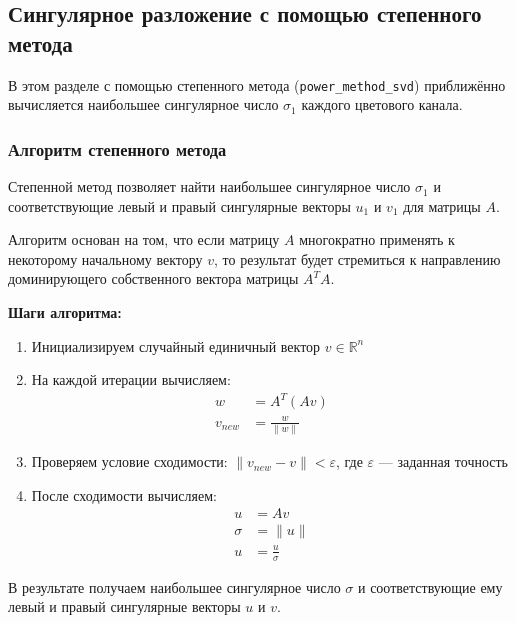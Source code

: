 \documentclass[a4paper,12pt]{article}
\begin{document}
\subsection{Сингулярное разложение с помощью степенного метода}
В этом разделе с помощью степенного метода (\texttt{power\_method\_svd}) приближённо вычисляется наибольшее сингулярное число $\sigma_1$ каждого цветового канала.

\subsubsection*{Алгоритм степенного метода}
Степенной метод позволяет найти наибольшее сингулярное число $\sigma_1$ и соответствующие левый и правый сингулярные векторы $u_1$ и $v_1$ для матрицы $A$.

Алгоритм основан на том, что если матрицу $A$ многократно применять к некоторому начальному вектору $v$, то результат будет стремиться к направлению доминирующего собственного вектора матрицы $A^TA$.

\textbf{Шаги алгоритма:}
\begin{enumerate}
    \item Инициализируем случайный единичный вектор $v \in \mathbb{R}^n$
    \item На каждой итерации вычисляем:
    \begin{align}
        w &= A^T(Av) \\
        v_{new} &= \frac{w}{\|w\|}
    \end{align}
    \item Проверяем условие сходимости: $\|v_{new} - v\| < \varepsilon$, где $\varepsilon$ — заданная точность
    \item После сходимости вычисляем:
    \begin{align}
        u &= Av \\
        \sigma &= \|u\| \\
        u &= \frac{u}{\sigma}
    \end{align}
\end{enumerate}

В результате получаем наибольшее сингулярное число $\sigma$ и соответствующие ему левый и правый сингулярные векторы $u$ и $v$.

\end{document}
